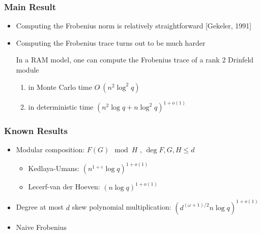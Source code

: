 \documentclass{beamer}
\begin{document}


\begin{frame}
\frametitle{Main Result}

\begin{itemize}
\item Computing the Frobenius norm is relatively straightforward [Gekeler, 1991]
\item Computing the Frobenius trace turns out to be much harder

\begin{theorem}
In a RAM model, one can compute the Frobenius trace of a rank 2 Drinfeld module
\begin{enumerate}
\item in Monte Carlo time $O\tilde{~}(n^2 \log^2 q)$
\item in deterministic time $(n^2 \log q + n \log^2 q)^{1+o(1)}$

\end{enumerate}
\end{theorem}

\end{itemize}


\end{frame}


\begin{frame}
\frametitle{Known Results}

\begin{itemize}
\item Modular composition: $F(G) \mod H$ , $\deg F, G,H \leq d$
\begin{itemize}
    \item Kedlaya-Umans: $(n^{1 + \varepsilon}
\log q)^{1+o(1)}$
    \item Lecerf-van der Hoeven: $(n
\log q)^{1+o(1)}$
\end{itemize}
\item Degree at most $d$ skew polynomial multiplication: $(d^{(\omega+1)/2} n\log q)^{1+o(1)}$
\item Naive Frobenius
    
\end{itemize}


\end{frame}


\end{document}
